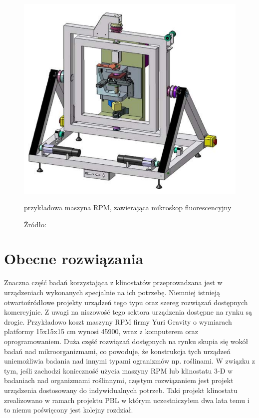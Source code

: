 \begin{figure}
	\centering
	\includegraphics[scale=0.5]{rpm}
	\caption{przykładowa maszyna RPM, zawierająca mikroskop fluorescencyjny} 
	\caption*{Źródło: \cite{bib:rpmy}}
	\label{fig_rpm}
\end{figure}

\section{Obecne rozwiązania}

Znaczna część badań korzystająca z klinostatów przeprowadzana jest w urządzeniach
 wykonanych specjalnie na ich potrzebę. Niemniej istnieją otwartoźródłowe projekty urządzeń
  tego typu oraz szereg rozwiązań dostępnych komercyjnie. Z uwagi na niszowość tego sektora
   urządzenia dostępne na rynku są drogie. Przykładowo koszt maszyny RPM firmy Yuri Gravity
    o wymiarach platformy 15x15x15 cm wynosi \SI{45900}{\geneuro}, wraz z komputerem oraz oprogramowaniem. Duża część rozwiązań dostępnych na rynku skupia
     się wokół badań nad mikroorganizmami, co powoduje, że konstrukcja tych urządzeń
      uniemożliwia badania nad innymi typami ogranizmów np. roślinami. W związku z tym, jeśli
       zachodzi konieczność użycia maszyny RPM lub klinostatu 3-D w badaniach nad
        organizmami roślinnymi, częstym rozwiązaniem jest projekt urządzenia dostosowany do
         indywidualnych potrzeb. Taki projekt klinostatu zrealizowano w ramach projektu PBL w którym
          uczestniczyłem dwa lata temu i to niemu poświęcony jest kolejny rozdział.
          
